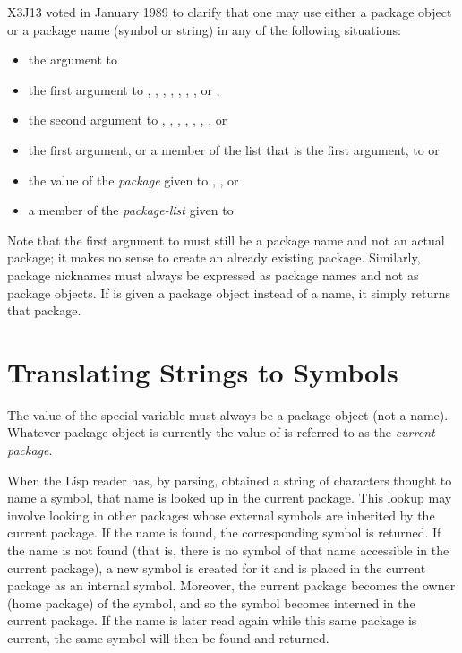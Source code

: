 \begin{new}
X3J13 voted in January 1989
to clarify that one may use either a package object or
a package name (symbol or string) in any of the following
situations:
\begin{itemize}
\item the  argument to 
\item the first argument to , ,
, ,
, ,
, or ,


\item the second argument to , ,
, , , , ,
or 
\item the first argument, or a member of the list that is the first argument,
to  or 
\item the value of the {\it package} given to ,
, or 
\item a member of the {\it package-list} given to 
\end{itemize}
Note that the first argument to  must still be a package
name and not an actual package; it makes no sense to create an already
existing package.  Similarly, package nicknames must always be expressed
as package names and not as package objects.  If  is
given a package object instead of a name, it simply returns that package.
\end{new}

\section{Translating Strings to Symbols}
\label{STRING-TO-SYMBOL-SECTION}

The value of the special variable  must always be a package
object (not a name).  Whatever package object is currently the
value of  is referred to as the {\it current package}.

When the Lisp reader has, by parsing, obtained a string of characters
thought to name a symbol, that name is looked up in the current package.
This lookup may involve looking in other packages whose external symbols
are inherited by the current package.  If the name is found,
the corresponding symbol is returned.  If the name is not found
(that is, there is no symbol of that name accessible in the current package),
a new symbol is created for it and is placed in the current package as an
internal symbol.  Moreover, the current package becomes the owner
(home package) of the symbol, and so the symbol becomes interned
in the current package.
If the name is later read again while this same package is
current, the same symbol will then be found and returned.

